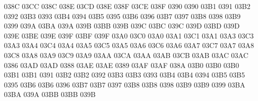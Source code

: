 \setcclcuc 038C 03CC 038C %
\setcclcuc 038E 03CD 038E %
\setcclcuc 038F 03CE 038F %
 0390 0390 %
 03B1 0391 %
 03B2 0392 %
 03B3 0393 %
 03B4 0394 %
 03B5 0395 %
 03B6 0396 %
 03B7 0397 %
 03B8 0398 %
 03B9 0399 %
\setcclcuc 039A 03BA 039A %
\setcclcuc 039B 03BB 039B %
\setcclcuc 039C 03BC 039C %
\setcclcuc 039D 03BD 039D %
\setcclcuc 039E 03BE 039E %
\setcclcuc 039F 03BF 039F %
\setcclcuc 03A0 03C0 03A0 %
\setcclcuc 03A1 03C1 03A1 %
\setcclcuc 03A3 03C3 03A3 %
\setcclcuc 03A4 03C4 03A4 %
\setcclcuc 03A5 03C5 03A5 %
\setcclcuc 03A6 03C6 03A6 %
\setcclcuc 03A7 03C7 03A7 %
\setcclcuc 03A8 03C8 03A8 %
\setcclcuc 03A9 03C9 03A9 %
\setcclcuc 03AA 03CA 03AA %
\setcclcuc 03AB 03CB 03AB %
\setcclcuc 03AC 03AC 0386 %
\setcclcuc 03AD 03AD 0388 %
\setcclcuc 03AE 03AE 0389 %
\setcclcuc 03AF 03AF 038A %
\setcclcuc 03B0 03B0 03B0 %
\setcclcuc 03B1 03B1 0391 %
\setcclcuc 03B2 03B2 0392 %
\setcclcuc 03B3 03B3 0393 %
\setcclcuc 03B4 03B4 0394 %
\setcclcuc 03B5 03B5 0395 %
\setcclcuc 03B6 03B6 0396 %
\setcclcuc 03B7 03B7 0397 %
\setcclcuc 03B8 03B8 0398 %
\setcclcuc 03B9 03B9 0399 %
\setcclcuc 03BA 03BA 039A %
\setcclcuc 03BB 03BB 039B %
